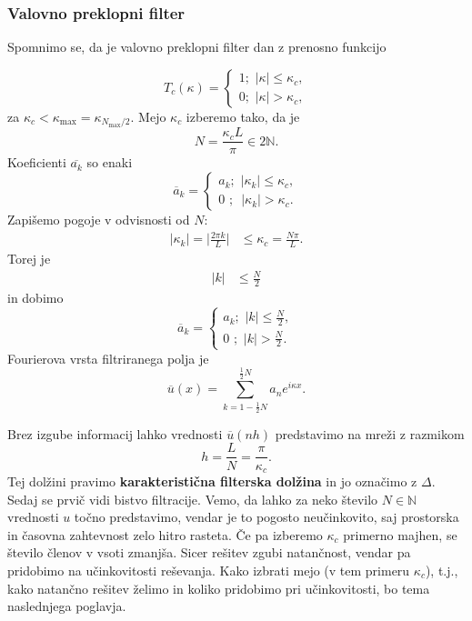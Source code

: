 \documentclass[mat2, tisk]{fmfdelo}
\newcommand{\N}{\mathbb N}
\begin{document}
\subsubsection{Valovno preklopni filter}

Spomnimo se, da je valovno preklopni filter dan z prenosno 
funkcijo 

$$
T_c(\kappa)=\begin{cases}
  1 ;\,\, |\kappa| \leq \kappa_c, \\
  0 ;\,\, |\kappa| > \kappa_c,
\end{cases}
$$
za $\kappa_c < \kappa_\text{max} = \kappa_{N_\text{max}/2}$. Mejo $\kappa_c$
izberemo tako, da je 
$$
N = \frac{\kappa_c L}{\pi} \in 2\N.
$$
Koeficienti $\overline{a_k}$ so enaki 
$$
\overline{a}_k=\begin{cases}
  a_k ;\,\, |\kappa_k| \leq \kappa_c, \\
  0 \,\,;\,\,\, |\kappa_k| > \kappa_c.
\end{cases}
$$
Zapišemo pogoje v odvisnosti od $N$:
\begin{align*}
|\kappa_k| = \Big| \frac{2\pi k}{L} \Big| &\leq \kappa_c = \frac{N\pi}{L}.
\end{align*}
Torej je 
\begin{align*}
|k| &\leq \frac{N}{2}
\end{align*}
in dobimo
$$
\overline{a}_k= \begin{cases}a_k ;\,\, |k| \leq \frac{N}{2}, \\ 0 \,\,;\,\, |k| > \frac{N}{2}. \end{cases}
$$
Fourierova vrsta filtriranega polja je
\begin{equation}
\label{Fourier_število}
\overline{u}(x) = \sum_{k = 1 - \frac{1}{2}N}^{\frac{1}{2}N} a_n e^{i\kappa x}.
\end{equation}

Brez izgube informacij lahko vrednosti $\overline{u}(nh)$ predstavimo na mreži 
z razmikom 
\begin{equation*}
h = \frac{L}{N} = \frac{\pi}{\kappa_c}.
\end{equation*}
Tej dolžini pravimo \textbf{karakteristična filterska dolžina} in jo 
označimo z $\Delta$. 
\noindent
Sedaj se prvič vidi bistvo filtracije. Vemo, da lahko za neko število 
$N\in \N$ vrednosti $u$ točno predstavimo, vendar je to pogosto neučinkovito, 
saj prostorska in časovna zahtevnost zelo hitro rasteta. Če pa izberemo
$\kappa_c$ primerno majhen, se število členov v vsoti zmanjša.
Sicer rešitev zgubi natančnost, vendar pa pridobimo na učinkovitosti reševanja. 
Kako izbrati mejo (v tem primeru $\kappa_c$), t.j., kako natančno
rešitev želimo in koliko pridobimo pri učinkovitosti, bo tema naslednjega poglavja.
\end{document}
